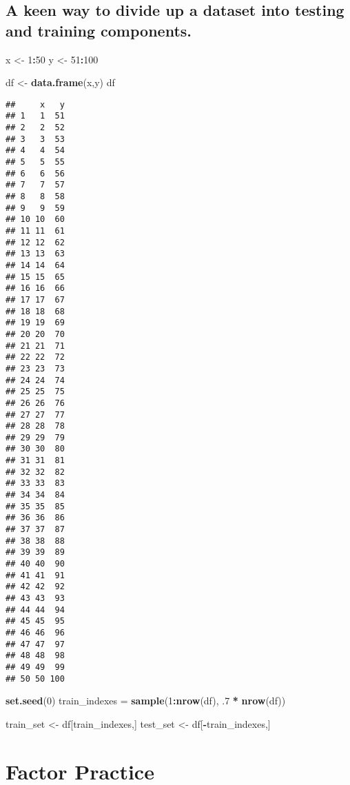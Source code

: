 \documentclass[]{book}
\newenvironment{Shaded}{\begin{snugshade}}{\end{snugshade}}
\newcommand{\DecValTok}[1]{\textcolor[rgb]{0.00,0.00,0.81}{#1}}
\newcommand{\FloatTok}[1]{\textcolor[rgb]{0.00,0.00,0.81}{#1}}
\newcommand{\KeywordTok}[1]{\textcolor[rgb]{0.13,0.29,0.53}{\textbf{#1}}}
\newcommand{\NormalTok}[1]{#1}
\newcommand{\OperatorTok}[1]{\textcolor[rgb]{0.81,0.36,0.00}{\textbf{#1}}}
\newcommand{\StringTok}[1]{\textcolor[rgb]{0.31,0.60,0.02}{#1}}
\begin{document}
\hypertarget{a-keen-way-to-divide-up-a-dataset-into-testing-and-training-components.}{%
\section{A keen way to divide up a dataset into testing and training components.}\label{a-keen-way-to-divide-up-a-dataset-into-testing-and-training-components.}}

\begin{Shaded}
\begin{Highlighting}[]
\NormalTok{x <-}\StringTok{ }\DecValTok{1}\OperatorTok{:}\DecValTok{50}
\NormalTok{y <-}\StringTok{ }\DecValTok{51}\OperatorTok{:}\DecValTok{100}

\NormalTok{df <-}\StringTok{ }\KeywordTok{data.frame}\NormalTok{(x,y)}
\NormalTok{df}
\end{Highlighting}
\end{Shaded}

\begin{verbatim}
##     x   y
## 1   1  51
## 2   2  52
## 3   3  53
## 4   4  54
## 5   5  55
## 6   6  56
## 7   7  57
## 8   8  58
## 9   9  59
## 10 10  60
## 11 11  61
## 12 12  62
## 13 13  63
## 14 14  64
## 15 15  65
## 16 16  66
## 17 17  67
## 18 18  68
## 19 19  69
## 20 20  70
## 21 21  71
## 22 22  72
## 23 23  73
## 24 24  74
## 25 25  75
## 26 26  76
## 27 27  77
## 28 28  78
## 29 29  79
## 30 30  80
## 31 31  81
## 32 32  82
## 33 33  83
## 34 34  84
## 35 35  85
## 36 36  86
## 37 37  87
## 38 38  88
## 39 39  89
## 40 40  90
## 41 41  91
## 42 42  92
## 43 43  93
## 44 44  94
## 45 45  95
## 46 46  96
## 47 47  97
## 48 48  98
## 49 49  99
## 50 50 100
\end{verbatim}

\begin{Shaded}
\begin{Highlighting}[]
\KeywordTok{set.seed}\NormalTok{(}\DecValTok{0}\NormalTok{)}
\NormalTok{train_indexes =}\StringTok{ }\KeywordTok{sample}\NormalTok{(}\DecValTok{1}\OperatorTok{:}\KeywordTok{nrow}\NormalTok{(df), }\FloatTok{.7} \OperatorTok{*}\StringTok{ }\KeywordTok{nrow}\NormalTok{(df))}

\NormalTok{train_set <-}\StringTok{ }\NormalTok{df[train_indexes,]}
\NormalTok{test_set <-}\StringTok{ }\NormalTok{df[}\OperatorTok{-}\NormalTok{train_indexes,]}
\end{Highlighting}
\end{Shaded}

\hypertarget{factor-practice}{%
\chapter{Factor Practice}\label{factor-practice}}
\end{document}
